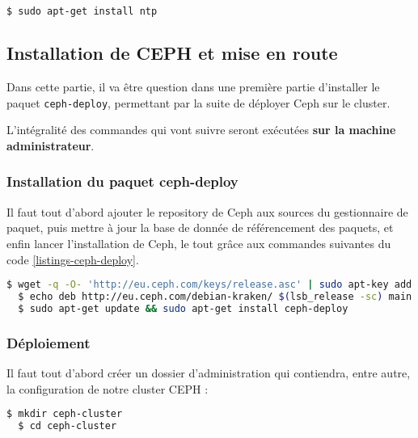 \begin{lstlisting}[language=bash]
  $ sudo apt-get install ntp
\end{lstlisting}
\newpage

\subsection{Installation de CEPH et mise en route}

Dans cette partie, il va être question dans une première partie d'installer le paquet \verb|ceph-deploy|, permettant par la suite de déployer Ceph sur le cluster.

\begin{WarningBox}
L'intégralité des commandes qui vont suivre seront exécutées \textbf{sur la machine administrateur}.
\end{WarningBox}

\subsubsection{Installation du paquet ceph-deploy}

Il faut tout d'abord ajouter le repository de Ceph aux sources du gestionnaire de paquet, puis mettre à jour la base de donnée de référencement des paquets, et enfin lancer l'installation de Ceph, le tout grâce aux commandes suivantes du code \ref{listings-ceph-deploy}.

\vspace{3mm}
\begin{lstlisting}[language=bash,caption={Installation du paquet ceph-deploy},label={listings-ceph-deploy}]
  $ wget -q -O- 'http://eu.ceph.com/keys/release.asc' | sudo apt-key add -
  $ echo deb http://eu.ceph.com/debian-kraken/ $(lsb_release -sc) main | sudo tee /etc/apt/sources.list.d/ceph.list
  $ sudo apt-get update && sudo apt-get install ceph-deploy
\end{lstlisting}

\subsubsection{Déploiement}

Il faut tout d'abord créer un dossier d'administration qui contiendra, entre autre, la configuration de notre cluster CEPH :

\vspace{3mm}
\begin{lstlisting}[language=bash]
  $ mkdir ceph-cluster
  $ cd ceph-cluster
\end{lstlisting}

